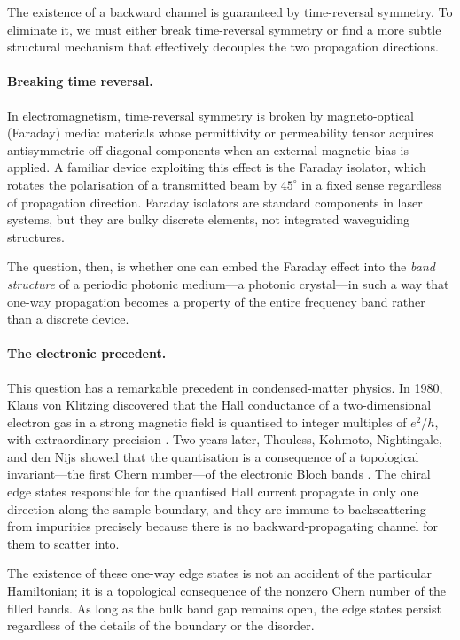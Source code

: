 The existence of a backward channel is guaranteed by time-reversal
symmetry.  To eliminate it, we must either break time-reversal symmetry
or find a more subtle structural mechanism that effectively decouples
the two propagation directions.

\paragraph{Breaking time reversal.}
In electromagnetism, time-reversal symmetry is broken by
magneto-optical (Faraday) media: materials whose permittivity or
permeability tensor acquires antisymmetric off-diagonal components
when an external magnetic bias is applied.  A familiar device
exploiting this effect is the Faraday isolator, which rotates the
polarisation of a transmitted beam by $45^{\circ}$ in a fixed
sense regardless of propagation direction.  Faraday isolators
are standard components in laser systems, but they are bulky
discrete elements, not integrated waveguiding structures.

The question, then, is whether one can embed the Faraday effect
into the \emph{band structure} of a periodic photonic medium---a
photonic crystal---in such a way that one-way propagation becomes a
property of the entire frequency band rather than a discrete device.

\paragraph{The electronic precedent.}
This question has a remarkable precedent in condensed-matter physics.
In 1980, Klaus von Klitzing discovered that the Hall conductance of a
two-dimensional electron gas in a strong magnetic field is quantised
to integer multiples of $e^2/h$, with extraordinary precision
\cite{klitzing2015method}.  Two years later, Thouless, Kohmoto, Nightingale,
and den Nijs showed that the quantisation is a consequence of a
topological invariant---the first Chern number---of the electronic
Bloch bands \cite{thouless1982quantized}.
The chiral edge states responsible for the quantised Hall current
propagate in only one direction along the sample boundary, and they
are immune to backscattering from impurities precisely because there
is no backward-propagating channel for them to scatter into.

The existence of these one-way edge states is not an accident of the
particular Hamiltonian; it is a topological consequence of the
nonzero Chern number of the filled bands.  As long as the bulk band
gap remains open, the edge states persist regardless of the details
of the boundary or the disorder.

